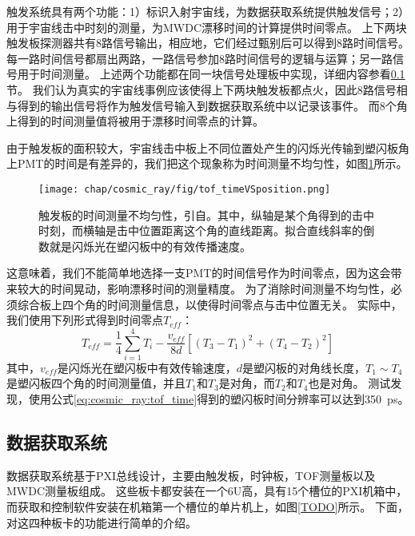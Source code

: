 触发系统具有两个功能：1）标识入射宇宙线，为数据获取系统提供触发信号；2）用于宇宙线击中时刻的测量，为MWDC漂移时间的计算提供时间零点。
上下两块触发板探测器共有8路信号输出，相应地，它们经过甄别后可以得到8路时间信号。
每一路时间信号都扇出两路，一路信号参加8路时间信号的逻辑与运算；另一路信号用于时间测量。
上述两个功能都在同一块信号处理板中实现，详细内容参看\ref{sec:cosmic_ray:daq_system}节。
我们认为真实的宇宙线事例应该使得上下两块触发板都点火，因此8路信号相与得到的输出信号将作为触发信号输入到数据获取系统中以记录该事件。
而8个角上得到的时间测量值将被用于漂移时间零点的计算。

由于触发板的面积较大，宇宙线击中板上不同位置处产生的闪烁光传输到塑闪板角上PMT的时间是有差异的，我们把这个现象称为时间测量不均匀性，如图\ref{fig:cosmic_ray:tof_timeVSposition}所示。
\begin{figure}[htbp]
	\centering
	\texttt{[image: chap/cosmic\_ray/fig/tof\_timeVSposition.png]}
	\caption{触发板的时间测量不均匀性，引自\cite{tang_large_2015}。其中，纵轴是某个角得到的击中时刻，而横轴是击中位置距离这个角的直线距离。拟合直线斜率的倒数就是闪烁光在塑闪板中的有效传播速度。}
	\label{fig:cosmic_ray:tof_timeVSposition}
\end{figure}
这意味着，我们不能简单地选择一支PMT的时间信号作为时间零点，因为这会带来较大的时间晃动，影响漂移时间的测量精度。
为了消除时间测量不均匀性，必须综合板上四个角的时间测量信息，以使得时间零点与击中位置无关。
实际中，我们使用下列形式\cite{annand_large_1987}得到时间零点$T_{eff}$：
\begin{equation}
	T_{eff} = \frac{1}{4}\sum^4_{i=1}T_i - \frac{v_{eff}}{8d}[(T_3-T_1)^2+(T_4-T_2)^2]
	\label{eq:cosmic_ray:tof_time}
\end{equation}
其中，$v_{eff}$是闪烁光在塑闪板中有效传输速度，$d$是塑闪板的对角线长度，$T_1\sim T_4$是塑闪板四个角的时间测量值，并且$T_1$和$T_3$是对角，而$T_2$和$T_4$也是对角。
测试发现，使用公式\ref{eq:cosmic_ray:tof_time}得到的塑闪板时间分辨率可以达到\SI{350}{\pico\second}\cite{tang_large_2015}。

\subsection{数据获取系统}
\label{sec:cosmic_ray:daq_system}
数据获取系统基于PXI总线设计，主要由触发板，时钟板，TOF测量板以及MWDC测量板组成\cite{kanglongfei_thesis,zhoujiawen_thesis}。
这些板卡都安装在一个6U高，具有15个槽位的PXI机箱中\cite{pxi_chassis}，而获取和控制软件安装在机箱第一个槽位的单片机上，如图\ref{TODO}所示。
下面，对这四种板卡的功能进行简单的介绍。

